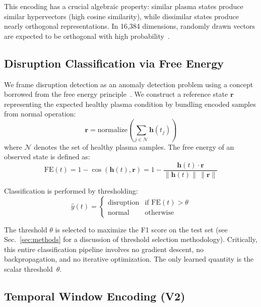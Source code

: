 \documentclass[twocolumn,prl,aps,superscriptaddress,floatfix]{revtex4-2}
\begin{document}
This encoding has a crucial algebraic property: similar plasma states produce similar hypervectors (high cosine similarity), while dissimilar states produce nearly orthogonal representations. In 16,384 dimensions, randomly drawn vectors are expected to be orthogonal with high probability~\cite{Kanerva2009,Plate2003}.

\subsection{Disruption Classification via Free Energy}

We frame disruption detection as an anomaly detection problem using a concept borrowed from the free energy principle~\cite{Friston2010}. We construct a reference state $\mathbf{r}$ representing the expected healthy plasma condition by bundling encoded samples from normal operation:
\begin{equation}
\mathbf{r} = \mathrm{normalize}\left(\sum_{j \in \mathcal{N}} \mathbf{h}(t_j)\right)
\label{eq:reference}
\end{equation}
where $\mathcal{N}$ denotes the set of healthy plasma samples. The free energy of an observed state is defined as:
\begin{equation}
\mathrm{FE}(t) = 1 - \cos\!\left(\mathbf{h}(t), \mathbf{r}\right) = 1 - \frac{\mathbf{h}(t) \cdot \mathbf{r}}{\|\mathbf{h}(t)\| \, \|\mathbf{r}\|}
\label{eq:free_energy}
\end{equation}

Classification is performed by thresholding:
\begin{equation}
\hat{y}(t) = \begin{cases} \text{disruption} & \text{if } \mathrm{FE}(t) > \theta \\ \text{normal} & \text{otherwise} \end{cases}
\label{eq:classify}
\end{equation}

The threshold $\theta$ is selected to maximize the F1 score on the test set (see Sec.~\ref{sec:methods} for a discussion of threshold selection methodology). Critically, this entire classification pipeline involves no gradient descent, no backpropagation, and no iterative optimization. The only learned quantity is the scalar threshold~$\theta$.

\subsection{Temporal Window Encoding (V2)}
\end{document}
